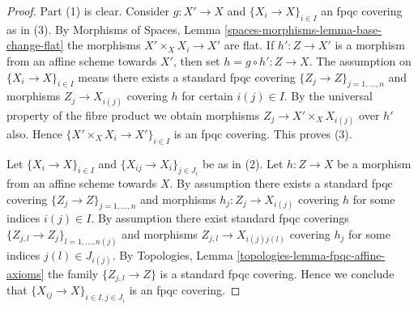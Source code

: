\documentclass{stacks-project}
\theoremstyle{plain}
\theoremstyle{definition}
\theoremstyle{remark}
\numberwithin{equation}{subsection}
\begin{document}
\begin{proof}
Part (1) is clear. Consider $g : X' \to X$ and
$\{X_i \to X\}_{i\in I}$ an fpqc covering as in (3). By
Morphisms of Spaces, Lemma \ref{spaces-morphisms-lemma-base-change-flat}
the morphisms $X' \times_X X_i \to X'$
are flat. If $h' : Z \to X'$ is a morphism from an affine scheme
towards $X'$, then set $h = g \circ h' : Z \to X$. The assumption
on $\{X_i \to X\}_{i\in I}$ means there exists a standard fpqc covering
$\{Z_j \to Z\}_{j = 1, \ldots, n}$ and morphisms $Z_j \to X_{i(j)}$ covering
$h$ for certain $i(j) \in I$. By the universal property of the fibre product
we obtain morphisms $Z_j \to X' \times_X X_{i(j)}$ over $h'$ also.
Hence $\{X' \times_X X_i \to X'\}_{i\in I}$ is an fpqc covering.
This proves (3).

\medskip\noindent
Let $\{X_i \to X\}_{i\in I}$ and $\{X_{ij} \to X_i\}_{j\in J_i}$ be as
in (2). Let $h : Z \to X$ be a morphism from an affine scheme towards $X$.
By assumption there exists a standard fpqc covering
$\{Z_j \to Z\}_{j = 1, \ldots, n}$ and morphisms $h_j : Z_j \to X_{i(j)}$
covering $h$ for some indices $i(j) \in I$. By assumption there exist
standard fpqc coverings
$\{Z_{j, l} \to Z_j\}_{l = 1, \ldots, n(j)}$
and morphisms $Z_{j, l} \to X_{i(j)j(l)}$ covering
$h_j$ for some indices $j(l) \in J_{i(j)}$. By
Topologies, Lemma \ref{topologies-lemma-fpqc-affine-axioms}
the family $\{Z_{j, l} \to Z\}$ is a standard fpqc covering.
Hence we conclude that $\{X_{ij} \to X\}_{i \in I, j\in J_i}$
is an fpqc covering.
\end{proof}
\end{document}
